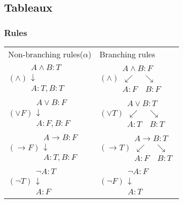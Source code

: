 \subsection{Tableaux}
\subsubsection{Rules}
	\begin{tabular}{m{3cm} m{3cm} }
	Non-branching rules($\alpha$)  & Branching rules\\
	$ (\land) \begin{matrix}
	A\land B:T\\
	\downarrow\\
	A:T,B:T
	\end{matrix} $
	&$ (\land)  \begin{matrix}
	A\land B:F\\
	\swarrow \quad \searrow\\
	A:F \quad B:F
	\end{matrix}$\\
	$ (\lor F) \begin{matrix}
	A\lor B:F\\
	\downarrow\\
	A:F,B:F
	\end{matrix} $ &
	$ (\lor T) \begin{matrix}
	A\lor B:T\\
	\swarrow \quad \searrow\\
	A:T\quad B:T
	\end{matrix} $ \\
		$ (\to F) \begin{matrix}
		A\to B:F\\
		\downarrow\\
		A:T,B:F
		\end{matrix} $ &
		$ (\to T) \begin{matrix}
		A\to B:T\\
		\swarrow \quad \searrow\\
		A:F\quad B:T
		\end{matrix} $ \\
		$ (\neg T) 
		\begin{matrix}
		\neg A:T\\
		\downarrow\\
		A:F
		\end{matrix} $ &
		$ (\neg F) 
		\begin{matrix}
		\neg A:F\\
		\downarrow\\
		A:T
		\end{matrix} $
		
		 
	\end{tabular}